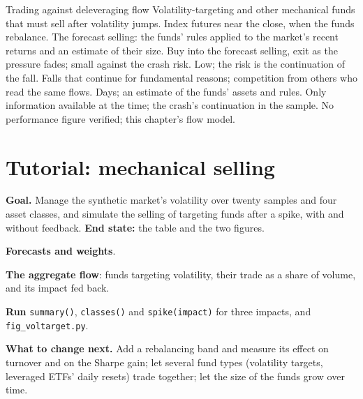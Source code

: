 \begin{strategyfile}{Trading against deleveraging flow}\label{strat:s1:volatility-targeting-and-risk-managed-portfolios:against}
 Volatility-targeting and other mechanical funds that must sell after volatility jumps.
 Index futures near the close, when the funds rebalance.
 The forecast selling: the funds' rules applied to the market's recent returns and an estimate of their size.
 Buy into the forecast selling, exit as the pressure fades; small against the crash risk.
 Low; the risk is the continuation of the fall.
 Falls that continue for fundamental reasons; competition from others who read the same flows.
 Days; an estimate of the funds' assets and rules.
 Only information available at the time; the crash's continuation in the sample.
 No performance figure verified; this chapter's flow model.
\end{strategyfile}

\section{Tutorial: mechanical selling}\label{tut:s1:volatility-targeting-and-risk-managed-portfolios:tut}

\begin{tutorial}
\textbf{Goal.} Manage the synthetic market's volatility over twenty samples and four asset classes, and simulate the selling of targeting funds after a
spike, with and without feedback. \textbf{End state:} the table and the two figures.
\begin{tutsteps}
\item \textbf{Forecasts and weights}.
\label{lst:s1:volatility-targeting-and-risk-managed-portfolios:weights}
\item \textbf{The aggregate flow}: funds targeting volatility, their trade as a share of volume, and its impact fed back.
\label{lst:s1:volatility-targeting-and-risk-managed-portfolios:flow}
\item \textbf{Run} \texttt{summary()}, \texttt{classes()} and \texttt{spike(impact)} for three impacts, and \texttt{fig\_voltarget.py}.
\end{tutsteps}
\textbf{What to change next.} Add a rebalancing band and measure its effect on turnover and on the Sharpe gain; let several fund types (volatility
targets, leveraged ETFs' daily resets) trade together; let the size of the funds grow over time.
\end{tutorial}

